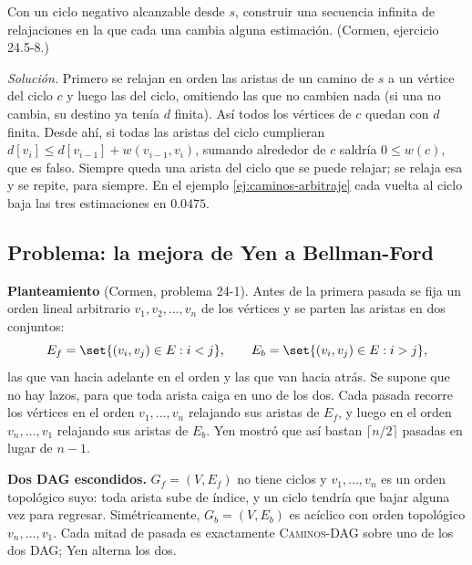 \documentclass[11pt,letterpaper]{article}
\begin{document}
\begin{ejercicio}
  Con un ciclo negativo alcanzable desde $s$, construir una secuencia
  infinita de relajaciones en la que cada una cambia alguna
  estimación. (Cormen, ejercicio 24.5-8.)

  \emph{Solución.} Primero se relajan en orden las aristas de un
  camino de $s$ a un vértice del ciclo $c$ y luego las del ciclo,
  omitiendo las que no cambien nada (si una no cambia, su destino ya
  tenía $d$ finita). Así todos los vértices de $c$ quedan con $d$
  finita. Desde ahí, si todas las aristas del ciclo cumplieran
  $d[v_i] \le d[v_{i-1}] + w(v_{i-1}, v_i)$, sumando alrededor de $c$
  saldría $0 \le w(c)$, que es falso. Siempre queda una arista del
  ciclo que se puede relajar; se relaja esa y se repite, para siempre.
  En el ejemplo \ref{ej:caminos-arbitraje} cada vuelta al ciclo baja
  las tres estimaciones en $0.0475$.
\end{ejercicio}


\subsection*{Problema: la mejora de Yen a Bellman-Ford}

\textbf{Planteamiento} (Cormen, problema 24-1). Antes de la primera
pasada se fija un orden lineal arbitrario $v_1, v_2, \dots, v_n$ de
los vértices y se parten las aristas en dos conjuntos:
\[
  E_f = \set{(v_i, v_j) \in E : i < j} , \qquad
  E_b = \set{(v_i, v_j) \in E : i > j} ,
\]
las que van hacia adelante en el orden y las que van hacia atrás. Se
supone que no hay lazos, para que toda arista caiga en uno de los dos.
Cada pasada recorre los vértices en el orden $v_1, \dots, v_n$
relajando sus aristas de $E_f$, y luego en el orden
$v_n, \dots, v_1$ relajando sus aristas de $E_b$. Yen mostró que así
bastan $\lceil n/2 \rceil$ pasadas en lugar de $n - 1$.

\textbf{Dos DAG escondidos.} $G_f = (V, E_f)$ no tiene ciclos y
$v_1, \dots, v_n$ es un orden topológico suyo: toda arista sube de
índice, y un ciclo tendría que bajar alguna vez para regresar.
Simétricamente, $G_b = (V, E_b)$ es acíclico con orden topológico
$v_n, \dots, v_1$. Cada mitad de pasada es exactamente
\textsc{Caminos-DAG} sobre uno de los dos DAG; Yen alterna los dos.
\end{document}
